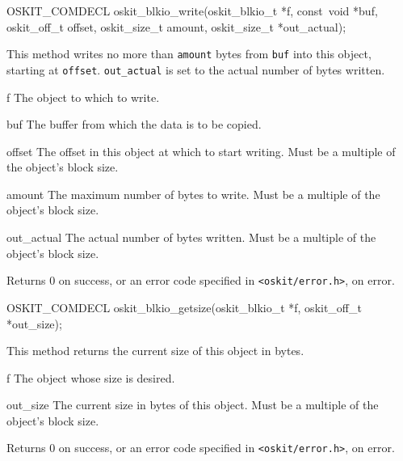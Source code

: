 \begin{apisyn}

	\funcproto OSKIT_COMDECL
	oskit_blkio_write(oskit_blkio_t *f, 
		         const~void *buf,
	                 oskit_off_t offset,
			 oskit_size_t amount,
			 \outparam oskit_size_t *out_actual);
\end{apisyn}
\begin{apidesc}
	This method writes no more than {\tt amount} bytes from
	{\tt buf} into this object, starting at {\tt offset}.
	{\tt out_actual} is set to the actual number of bytes written.
\end{apidesc}
\begin{apiparm}
	\item[f]
		The object to which to write.
	\item[buf]
		The buffer from which the data is to be copied.	
	\item[offset]
		The offset in this object at which to start writing.
		Must be a multiple of the object's block size.
	\item[amount]
		The maximum number of bytes to write.	
		Must be a multiple of the object's block size.
	\item[out_actual]
		The actual number of bytes written.
		Must be a multiple of the object's block size.
\end{apiparm}
\begin{apiret}
	Returns 0 on success, or an error code specified in
	{\tt <oskit/error.h>}, on error.
\end{apiret}


\begin{apisyn}

	\funcproto OSKIT_COMDECL
	oskit_blkio_getsize(oskit_blkio_t *f, 
			   \outparam oskit_off_t *out_size);
\end{apisyn}
\begin{apidesc}
	This method returns the current size of this object
	in bytes. 
\end{apidesc}
\begin{apiparm}
	\item[f]
		The object whose size is desired.
	\item[out_size]
		The current size in bytes of this object.
		Must be a multiple of the object's block size.
\end{apiparm}
\begin{apiret}
	Returns 0 on success, or an error code specified in
	{\tt <oskit/error.h>}, on error.
\end{apiret}

